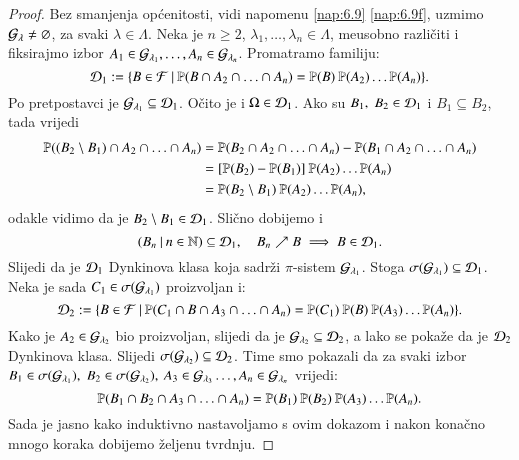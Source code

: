 \begin{proof}
    Bez smanjenja op\' cenitosti, vidi napomenu \ref{nap:6.9} \ref{nap:6.9f}, uzmimo $\mathcal{G}_\lambda \neq \varnothing$, za svaki $\lambda \in \Lambda$.
    Neka je $n \geq 2$, $\lambda_1, \ldots, \lambda_n \in \Lambda$, me\dj usobno razli\v citi i fiksirajmo izbor $A_1 \in \mathcal{G}_{\lambda_1}, \ldots, A_n \in \mathcal{G}_{\lambda_n}$.
    Promatramo familiju:
    \begin{equation*}
        \mathcal{D}_1 := \{{B \in \mathcal{F}} \: | \: {\mathbb{P}({B \cap A_2 \cap \ldots \cap A_n}) = \mathbb{P}({B}) \: \mathbb{P}({A_2}) \ldots \mathbb{P}({A_n})}\}.
    \end{equation*}
    Po pretpostavci je $\mathcal{G}_{\lambda_1} \subseteq \mathcal{D}_1$.
    O\v cito je i $\Omega \in \mathcal{D}_1$.
    Ako su $B_1, \; B_2 \in \mathcal{D}_1$ i $B_1 \subseteq B_2$, tada vrijedi
    \begin{align*}
        \mathbb{P}({(B_2 \setminus B_1) \cap A_2 \cap \ldots \cap A_n}) &= \mathbb{P}({B_2 \cap A_2 \cap \ldots \cap A_n}) - \mathbb{P}({B_1 \cap A_2 \cap \ldots \cap A_n}) \\
        &= [\mathbb{P}({B_2}) - \mathbb{P}({B_1})] \: \mathbb{P}({A_2}) \ldots \mathbb{P}({A_n})\\
        &= \mathbb{P}({B_2 \setminus B_1}) \: \mathbb{P}({A_2}) \ldots \mathbb{P}({A_n}),
    \end{align*}
    odakle vidimo da je $B_2 \setminus B_1 \in \mathcal{D}_1$.
    Sli\v cno dobijemo i
    \begin{equation*}
        ({B_n} \: | \: {n \in \mathbb{N}}) \subseteq \mathcal{D}_1, \quad B_n \nearrow B \implies B \in \mathcal{D}_1.
    \end{equation*}
    Slijedi da je $\mathcal{D}_1$ Dynkinova klasa koja sadr\v zi $\pi$-sistem $\mathcal{G}_{\lambda_1}$.
    Stoga $\sigma({\mathcal{G}_{\lambda_1}}) \subseteq \mathcal{D}_1$.
    Neka je sada $C_1 \in \sigma({\mathcal{G}_{\lambda_1}})$ proizvoljan i:
    \begin{equation*}
        \mathcal{D}_2 := \{{B \in \mathcal{F}} \: | \: {\mathbb{P}({C_1 \cap B \cap A_3 \cap \ldots \cap A_n}) = \mathbb{P}({C_1}) \: \mathbb{P}({B}) \: \mathbb{P}({A_3}) \ldots \mathbb{P}({A_n})}\}.
    \end{equation*}
    Kako je $A_2 \in \mathcal{G}_{\lambda_2}$ bio proizvoljan, slijedi da je $\mathcal{G}_{\lambda_2} \subseteq \mathcal{D}_2$, a lako se poka\v ze da je $\mathcal{D}_2$ Dynkinova klasa.
    Slijedi $\sigma({\mathcal{G}_{\lambda_2}}) \subseteq \mathcal{D}_2$.
    Time smo pokazali da za svaki izbor $B_1 \in \sigma({\mathcal{G}_{\lambda_1}}), \; B_2 \in \sigma({\mathcal{G}_{\lambda_2}}), \: A_3 \in \mathcal{G}_{\lambda_3} \ldots, A_n \in \mathcal{G}_{\lambda_n}$ vrijedi:
    \begin{equation*}
        \mathbb{P}({B_1 \cap B_2 \cap A_3 \cap \ldots \cap A_n}) = \mathbb{P}({B_1}) \: \mathbb{P}({B_2}) \: \mathbb{P}({A_3}) \ldots \mathbb{P}({A_n}).
    \end{equation*}
    Sada je jasno kako induktivno nastavoljamo s ovim dokazom i nakon kona\v cno mnogo koraka dobijemo \v zeljenu tvrdnju.
\end{proof}

